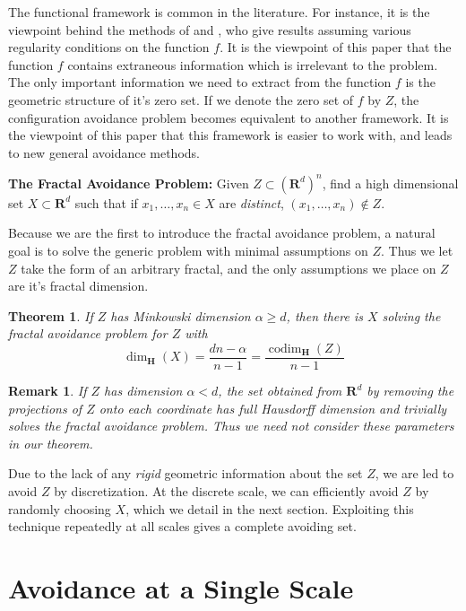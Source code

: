\documentclass{article}
\theoremstyle{plain}
\theoremstyle{plain}
\newtheorem{theorem}{Theorem}
\newtheorem*{remark}{Remark}
\DeclareMathOperator{\codim}{codim}
\begin{document}
\begin{multicols}{2}
The functional framework is common in the literature. For instance, it is the viewpoint behind the methods of \cite{MalabikaRob} and \cite{Mathe}, who give results assuming various regularity conditions on the function $f$. It is the viewpoint of this paper that the function $f$ contains extraneous information which is irrelevant to the problem. The only important information we need to extract from the function $f$ is the geometric structure of it's zero set. If we denote the zero set of $f$ by $Z$, the configuration avoidance problem becomes equivalent to another framework. It is the viewpoint of this paper that this framework is easier to work with, and leads to new general avoidance methods.

\begin{changemargin}{0.5em}{0em}
	{\bf The Fractal Avoidance Problem:} Given $Z \subset (\mathbf{R}^d)^n$, find a high dimensional set $X \subset \mathbf{R}^d$ such that if $x_1, \dots, x_n \in X$ are {\it distinct}, $(x_1, \dots, x_n) \not \in Z$.
\end{changemargin}

Because we are the first to introduce the fractal avoidance problem, a natural goal is to solve the generic problem with minimal assumptions on $Z$. Thus we let $Z$ take the form of an arbitrary fractal, and the only assumptions we place on $Z$ are it's fractal dimension.

\begin{theorem}
	If $Z$ has Minkowski dimension $\alpha \geq d$, then there is $X$ solving the fractal avoidance problem for $Z$ with
	\[ \dim_{\mathbf{H}}(X) = \frac{dn - \alpha}{n - 1} = \frac{\codim_{\mathbf{H}}(Z)}{n - 1} \]
\end{theorem}

\begin{remark}
	If $Z$ has dimension $\alpha < d$, the set obtained from $\mathbf{R}^d$ by removing the projections of $Z$ onto each coordinate has full Hausdorff dimension and trivially solves the fractal avoidance problem. Thus we need not consider these parameters in our theorem.
\end{remark}

Due to the lack of any {\it rigid} geometric information about the set $Z$, we are led to avoid $Z$ by discretization. At the discrete scale, we can efficiently avoid $Z$ by randomly choosing $X$, which we detail in the next section. Exploiting this technique repeatedly at all scales gives a complete avoiding set.

\section{Avoidance at a Single Scale}


\end{multicols}
\end{document}
